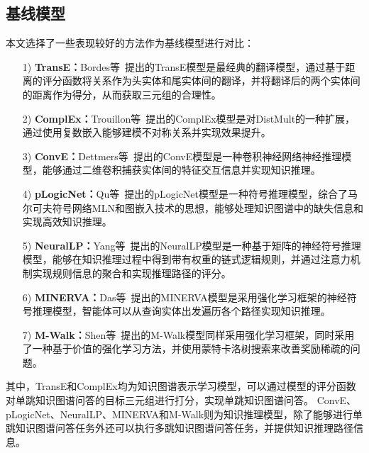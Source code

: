 \documentclass[algorithmlist, AutoFakeBold, AutoFakeSlant, figurelist, tablelist, nomlist, engineering, openany]{seuthesix} %
\begin{document}
\subsection{基线模型}
本文选择了一些表现较好的方法作为基线模型进行对比：
\begin{itemize}
  \item [1)]\textbf{TransE：}Bordes等~\cite{bordes2013translating}提出的TransE模型是最经典的翻译模型，通过基于距离的评分函数将关系作为头实体和尾实体间的翻译，并将翻译后的两个实体间的距离作为得分，从而获取三元组的合理性。
  \item [2)]\textbf{ComplEx：}Trouillon等~\cite{trouillon2016complex}提出的ComplEx模型是对DistMult的一种扩展，通过使用复数嵌入能够建模不对称关系并实现效果提升。
  \item [3)]\textbf{ConvE：}Dettmers等~\cite{dettmers2018convolutional}提出的ConvE模型是一种卷积神经网络神经推理模型，能够通过二维卷积捕获实体间的特征交互信息并实现知识推理。
  \item [4)]\textbf{pLogicNet：}Qu等~\cite{qu2019probabilistic}提出的pLogicNet模型是一种符号推理模型，综合了马尔可夫符号网络MLN和图嵌入技术的思想，能够处理知识图谱中的缺失信息和实现高效知识推理。
  \item [5)]\textbf{NeuralLP：}Yang等~\cite{yang2017differentiable}提出的NeuralLP模型是一种基于矩阵的神经符号推理模型，能够在知识推理过程中得到带有权重的链式逻辑规则，并通过注意力机制实现规则信息的聚合和实现推理路径的评分。
  \item [6)]\textbf{MINERVA：}Das等~\cite{das2018go}提出的MINERVA模型是采用强化学习框架的神经符号推理模型，智能体可以从查询实体出发遍历各个路径实现知识推理。
  \item [7)]\textbf{M-Walk：}Shen等~\cite{shen2018m}提出的M-Walk模型同样采用强化学习框架，同时采用了一种基于价值的强化学习方法，并使用蒙特卡洛树搜索来改善奖励稀疏的问题。
\end{itemize}
其中，TransE和ComplEx均为知识图谱表示学习模型，可以通过模型的评分函数对单跳知识图谱问答的目标三元组进行打分，实现单跳知识图谱问答。
ConvE、pLogicNet、NeuralLP、MINERVA和M-Walk则为知识推理模型，除了能够进行单跳知识图谱问答任务外还可以执行多跳知识图谱问答任务，并提供知识推理路径信息。
\end{document}
